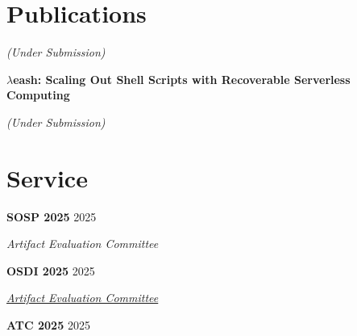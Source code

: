 \documentclass[margin,12pt]{resume}
\newcommand{\cvName}{Nikos Pagonas}
\newcommand{\subsectionVSpace}{\vspace{3.5ex}\xspace}
\newcommand{\sectionVSpace}{\vspace{1ex}\xspace} %
\newcommand{\sectionVSpaceCorrection}{\vspace{-3.5ex}} %
\newcommand{\header}[1]{\textbf{#1}\xspace}
\newcommand{\authors}[1]{#1\xspace}
\newcommand{\equalContributionNote}{(*equal contribution)\xspace}
\newcommand{\me}{\textbf{\cvName}\xspace}
\newcommand{\ordinal}[1]{\textsuperscript{#1}\xspace}
\newcommand{\paperTitle}[1]{\header{#1}\xspace}
\newcommand{\role}[1]{\textit{#1}\xspace}
\newcommand{\service}[1]{\header{#1}\xspace}
\newcommand{\underSubmission}{\textit{(Under Submission)}\xspace}
\newcommand{\venue}[1]{\textit{#1}\xspace}
\newenvironment{rSubsection}{}{\par\subsectionVSpace}
\newenvironment{rSection}[1]{\sectionVSpaceCorrection\section{#1}\xspace}{\sectionVSpace\par}
\begin{document}
\begin{resume}
\begin{rSection}{Publications}
\begin{rSubsection}
            \underSubmission


        \end{rSubsection}

        \begin{rSubsection}
            \paperTitle{\( \lambda \)eash: Scaling Out Shell Scripts with Recoverable Serverless Computing}

            \underSubmission


        \end{rSubsection}




    \end{rSection}

    \begin{rSection}{Service}
        \begin{rSubsection}
            \service{SOSP 2025} \hfill 2025

            \role{Artifact Evaluation Committee}
        \end{rSubsection}

        \begin{rSubsection}
            \service{OSDI 2025} \hfill 2025

            \role{\href{https://www.usenix.org/conference/atc25}{Artifact Evaluation Committee}}
        \end{rSubsection}

        \begin{rSubsection}
            \service{ATC 2025} \hfill 2025


\end{rSubsection}
\end{rSection}
\end{resume}
\end{document}
